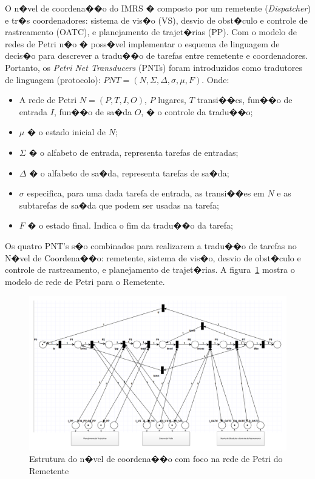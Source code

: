 O n�vel de coordena��o do IMRS � composto por um remetente
(\emph{Dispatcher}) e tr�s coordenadores: sistema de vis�o (VS), desvio de
obst�culo e controle de rastreamento (OATC), e planejamento de trajet�rias (PP).
Com o modelo de redes de Petri n�o � poss�vel implementar o esquema de linguagem de
decis�o para descrever a tradu��o de tarefas entre remetente e coordenadores.
Portanto, os \emph{Petri Net Transducers} (PNTs) foram introduzidos como
tradutores de linguagem (protocolo): $PNT = (N,\Sigma,
\Delta, \sigma, \mu, F)$. Onde:
\begin{itemize}
	\item A rede de Petri $N=(P,T,I,O)$, $P$ lugares, $T$
transi��es, fun��o de entrada $I$, fun��o de sa�da $O$, � o controle da
tradu��o;
	\item $\mu$ � o estado inicial de $N$;
	\item $\Sigma$ � o alfabeto de entrada, representa tarefas de entradas;
	\item $\Delta$ � o alfabeto de sa�da, representa tarefas de sa�da; 
	\item $\sigma$ especifica, para uma dada tarefa de entrada, as transi��es em
$N$ e as subtarefas de sa�da que podem ser usadas na tarefa;
	\item $F$ � o estado final. Indica o fim da tradu��o da tarefa;
\end{itemize}    

Os quatro PNT's s�o combinados para realizarem a tradu��o de tarefas no N�vel
de Coordena��o: remetente, sistema de vis�o, desvio de obst�culo
e controle de rastreamento, e planejamento de trajet�rias. A
figura~\ref{Saridis_2} mostra o modelo de rede de Petri para o Remetente.


\begin{figure}[H]
\centering
\includegraphics[width=1\columnwidth,angle=90]{figs/SARIDIS_2.pdf}
\caption{Estrutura do n�vel de coordena��o com foco na rede de Petri do
Remetente}
\label{Saridis_2}
\end{figure}


